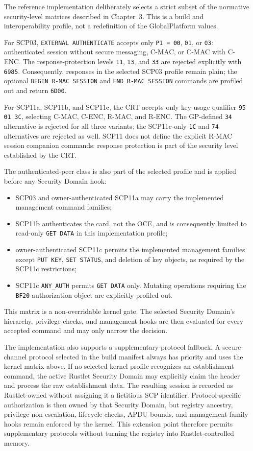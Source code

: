 The reference implementation deliberately selects a strict subset of the
normative security-level matrices described in Chapter~3. This is a build and
interoperability profile, not a redefinition of the GlobalPlatform values.

For SCP03, \texttt{EXTERNAL AUTHENTICATE} accepts only
\texttt{P1 = 00}, \texttt{01}, or \texttt{03}: authenticated session without
secure messaging, C-MAC, or C-MAC with C-ENC. The response-protection levels
\texttt{11}, \texttt{13}, and \texttt{33} are rejected explicitly with
\texttt{6985}. Consequently, responses in the selected SCP03 profile remain
plain; the optional \texttt{BEGIN R-MAC SESSION} and
\texttt{END R-MAC SESSION} commands are profiled out and return
\texttt{6D00}.

For SCP11a, SCP11b, and SCP11c, the CRT accepts only key-usage qualifier
\texttt{95 01 3C}, selecting C-MAC, C-ENC, R-MAC, and R-ENC. The GP-defined
\texttt{34} alternative is rejected for all three variants; the SCP11c-only
\texttt{1C} and \texttt{74} alternatives are rejected as well. SCP11 does not
define the explicit R-MAC session companion commands: response protection is
part of the security level established by the CRT.

The authenticated-peer class is also part of the selected profile and is
applied before any Security Domain hook:
\begin{itemize}
\item SCP03 and owner-authenticated SCP11a may carry the implemented
      management command families;
\item SCP11b authenticates the card, not the OCE, and is consequently limited
      to read-only \texttt{GET DATA} in this implementation profile;
\item owner-authenticated SCP11c permits the implemented management families
      except \texttt{PUT KEY}, \texttt{SET STATUS}, and deletion of key
      objects, as required by the SCP11c restrictions;
\item SCP11c \texttt{ANY\_AUTH} permits \texttt{GET DATA} only. Mutating
      operations requiring the \texttt{BF20} authorization object are
      explicitly profiled out.
\end{itemize}
This matrix is a non-overridable kernel gate. The selected Security Domain's
hierarchy, privilege checks, and management hooks are then evaluated for every
accepted command and may only narrow the decision.

The implementation also supports a supplementary-protocol fallback. A
secure-channel protocol selected in the build manifest always has priority and
uses the kernel matrix above. If no selected kernel profile recognizes an
establishment command, the active Rustlet Security Domain may explicitly claim
the header and process the raw establishment data. The resulting session is
recorded as Rustlet-owned without assigning it a fictitious SCP identifier.
Protocol-specific authorization is then owned by that Security Domain, but
registry ancestry, privilege non-escalation, lifecycle checks, APDU bounds, and
management-family hooks remain enforced by the kernel. This extension point
therefore permits supplementary protocols without turning the registry into
Rustlet-controlled memory.

